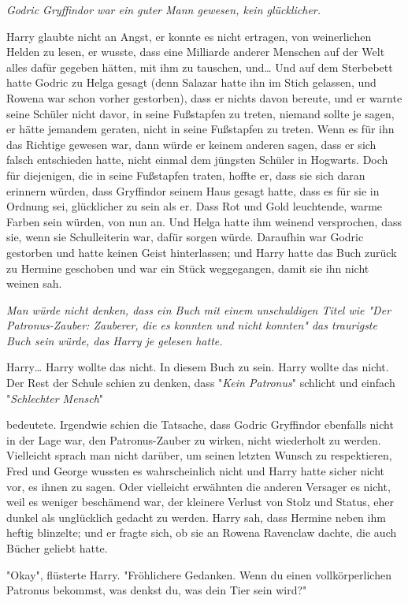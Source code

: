 {\emph{Godric Gryffindor war ein guter Mann gewesen, kein glücklicher.}

Harry glaubte nicht an Angst, er konnte es nicht ertragen, von weinerlichen Helden zu lesen, er wusste, dass eine Milliarde anderer Menschen auf der Welt alles dafür gegeben hätten, mit ihm zu tauschen, und… Und auf dem Sterbebett hatte Godric zu Helga gesagt (denn Salazar hatte ihn im Stich gelassen, und Rowena war schon vorher gestorben), dass er nichts davon bereute, und er warnte seine Schüler nicht davor, in seine Fußstapfen zu treten, niemand sollte je sagen, er hätte jemandem geraten, nicht in seine Fußstapfen zu treten. Wenn es für ihn das Richtige gewesen war, dann würde er keinem anderen sagen, dass er sich falsch entschieden hatte, nicht einmal dem jüngsten Schüler in Hogwarts. Doch für diejenigen, die in seine Fußstapfen traten, hoffte er, dass sie sich daran erinnern würden, dass Gryffindor seinem Haus gesagt hatte, dass es für sie in Ordnung sei, glücklicher zu sein als er. Dass Rot und Gold leuchtende, warme Farben sein würden, von nun an. Und Helga hatte ihm weinend versprochen, dass sie, wenn sie Schulleiterin war, dafür sorgen würde. Daraufhin war Godric gestorben und hatte keinen Geist hinterlassen; und Harry hatte das Buch zurück zu Hermine geschoben und war ein Stück weggegangen, damit sie ihn nicht weinen sah.

\emph{Man würde nicht denken, dass ein Buch mit einem unschuldigen Titel wie "Der Patronus-Zauber: Zauberer, die es konnten und nicht konnten" das traurigste Buch sein würde, das Harry je gelesen hatte.}

Harry… Harry wollte das nicht. In diesem Buch zu sein. Harry wollte das nicht. Der Rest der Schule schien zu denken, dass "\emph{Kein Patronus}" schlicht und einfach "\emph{Schlechter Mensch}"

bedeutete. Irgendwie schien die Tatsache, dass Godric Gryffindor ebenfalls nicht in der Lage war, den Patronus-Zauber zu wirken, nicht wiederholt zu werden. Vielleicht sprach man nicht darüber, um seinen letzten Wunsch zu respektieren, Fred und George wussten es wahrscheinlich nicht und Harry hatte sicher nicht vor, es ihnen zu sagen. Oder vielleicht erwähnten die anderen Versager es nicht, weil es weniger beschämend war, der kleinere Verlust von Stolz und Status, eher dunkel als unglücklich gedacht zu werden. Harry sah, dass Hermine neben ihm heftig blinzelte; und er fragte sich, ob sie an Rowena Ravenclaw dachte, die auch Bücher geliebt hatte.

"Okay", flüsterte Harry. "Fröhlichere Gedanken. Wenn du einen vollkörperlichen Patronus bekommst, was denkst du, was dein Tier sein wird?"

}
